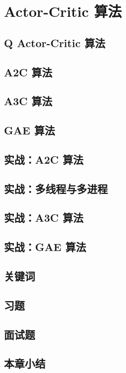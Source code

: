 
\section{ Actor-Critic 算法}
\subsection{ Q Actor-Critic 算法}
\subsection{ A2C 算法}
\subsection{ A3C 算法}
\subsection{ GAE 算法}

\subsection{实战：A2C 算法}
\subsection{实战：多线程与多进程}
\subsection{实战：A3C 算法}
\subsection{实战：GAE 算法}


\subsection{关键词}
\subsection{习题}
\subsection{面试题}
\subsection{本章小结}